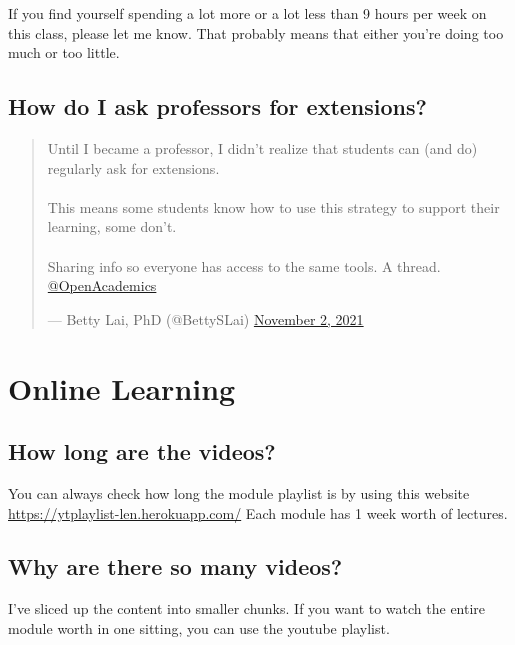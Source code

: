 \documentclass[
]{book}
\begin{document}
If you find yourself spending a lot more or a lot less than 9 hours per week on this class, please let me know. That probably means that either you're doing too much or too little.

\hypertarget{how-do-i-ask-professors-for-extensions}{%
\subsection{How do I ask professors for extensions?}\label{how-do-i-ask-professors-for-extensions}}

\begin{quote}
Until I became a professor, I didn't realize that students can (and
do) regularly ask for extensions.\\
~\\
This means some students know how to use this strategy to support
their learning, some don't.\\
~\\
Sharing info so everyone has access to the same tools. A thread.
\href{https://twitter.com/OpenAcademics}{@OpenAcademics}

--- Betty Lai, PhD (@BettySLai) \href{https://twitter.com/BettySLai/status/1455555111397117954}{November 2,
2021}
\end{quote}

\hypertarget{online-learning}{%
\section{Online Learning}\label{online-learning}}

\hypertarget{how-long-are-the-videos}{%
\subsection{How long are the videos?}\label{how-long-are-the-videos}}

You can always check how long the module playlist is by using this website \url{https://ytplaylist-len.herokuapp.com/}
Each module has 1 week worth of lectures.

\hypertarget{why-are-there-so-many-videos}{%
\subsection{Why are there so many videos?}\label{why-are-there-so-many-videos}}

I've sliced up the content into smaller chunks.
If you want to watch the entire module worth in one sitting, you can use the youtube playlist.
\end{document}
